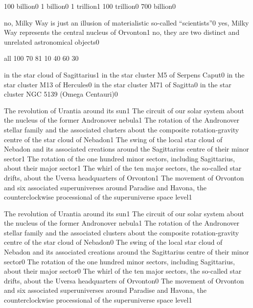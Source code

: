 {100 billion}{0}
{1 billion}{0}
{1 trillion}{1}
{100 trillion}{0}
{700 billion}{0}
\qstop

{no, Milky Way is just an illusion of materialistic so-called ``scientists''}{0}
{yes, Milky Way represents the central nucleus of Orvonton}{1}
{no, they are two distinct and unrelated astronomical objects}{0}
\qstop

{all 10}{0}
{7}{0}
{8}{1}
{1}{0}
{4}{0}
{6}{0}
{3}{0}
\qstop

{in the star cloud of Sagittarius}{1}
{in the star cluster M5 of Serpens Caput}{0}
{in the star cluster M13 of Hercules}{0}
{in the star cluster M71 of Sagitta}{0}
{in the star cluster NGC 5139 (Omega Centauri)}{0}
\qstop

{The revolution of Urantia around its sun}{1}
{The circuit of our solar system about the nucleus of the former Andronover nebula}{1}
{The rotation of the Andronover stellar family and the associated clusters about the composite rotation-gravity centre of the star cloud of Nebadon}{1}
{The swing of the local star cloud of Nebadon and its associated creations around the Sagittarius centre of their minor sector}{1}
{The rotation of the one hundred minor sectors, including Sagittarius, about their major sector}{1}
{The whirl of the ten major sectors, the so-called star drifts, about the Uversa headquarters of Orvonton}{1}
{The movement of Orvonton and six associated superuniverses around Paradise and Havona, the counterclockwise processional of the superuniverse space level}{1}
\qstop

{The revolution of Urantia around its sun}{1}
{The circuit of our solar system about the nucleus of the former Andronover nebula}{1}
{The rotation of the Andronover stellar family and the associated clusters about the composite rotation-gravity centre of the star cloud of Nebadon}{0}
{The swing of the local star cloud of Nebadon and its associated creations around the Sagittarius centre of their minor sector}{0}
{The rotation of the one hundred minor sectors, including Sagittarius, about their major sector}{0}
{The whirl of the ten major sectors, the so-called star drifts, about the Uversa headquarters of Orvonton}{0}
{The movement of Orvonton and six associated superuniverses around Paradise and Havona, the counterclockwise processional of the superuniverse space level}{1}
\qstop

